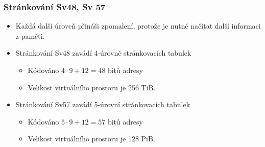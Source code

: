 \documentclass{beamer}
\begin{document}
\begin{frame}
\frametitle{Stránkování Sv48, Sv 57}

\begin{itemize}
\item Každá další úroveň přináši zpomalení, protože je nutné načítat další informaci z paměti.
\item Stránkování Sv48 zavádí 4-úrovně stránkovacích tabulek
\begin{itemize}
\item Kódováno $4 \cdot 9 + 12 = 48$ bitů adresy
\item Velikost virtuálního prostoru je 256 TiB.
\end{itemize}
\item Stránkování Sv57 zavádí 5-úrovní stránkovacích tabulek
\begin{itemize}
\item Kódováno $5 \cdot 9 + 12 = 57$ bitů adresy
\item Velikost virtuálního prostoru je 128 PiB.
\end{itemize}
\end{itemize}

\end{frame}
\end{document}
